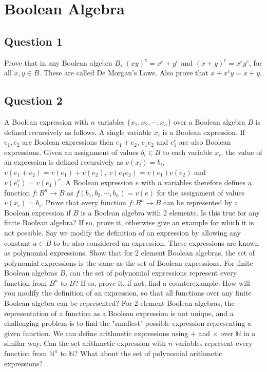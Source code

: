 \documentclass[12pt]{report}
\begin{document}
\chapter{Boolean Algebra}
\section*{Question 1}
Prove that in any Boolean algebra $B$, $(x y)^{c} = x^{c} + y^{c}$ and $(x + y)^{c} = x^{c} y^{c}$, for all $x, y \in B$. These are called De Morgan's Laws. Also prove that $x + x^{c} y = x + y$.
\section*{Question 2}
A Boolean expression with $n$ variables $\{x_{1}, x_{2}, \cdots, x_{n}\}$ over a Boolean algebra $B$ is defined recursively as follows. A single variable $x_{i}$ is a Boolean expression. If $e_{1}, e_{2}$ are Boolean expressions then $e_{1} + e_{2}$, $e_{1} e_{2}$ and $e_{1}^{c}$ are also Boolean expressions. Given an assignment of values $b_{i} \in B$ to each variable $x_{i}$, the value of an expression is defined recursively as $v(x_{i}) = b_{i}$, $v(e_{1} + e_{2}) = v(e_{1}) + v(e_{2})$, $v(e_{1}e_{2}) = v(e_{1})v(e_{2})$ and $v(e_{1}^{c}) = v(e_{1})^{c}$. A Boolean expression $e$ with $n$ variables therefore defines a function $f : B^{n} \rightarrow B$ as $f(b_{1}, b_{2}, \cdots, b_{n}) = v(e)$ for the assignment of values $v(x_{i}) = b_{i}$. Prove that every function $f : B^{n} \rightarrow B$ can be represented by a Boolean expression if $B$ is a Boolean algebra with 2 elements. Is this true for any finite Boolean algebra? If so, prove it, otherwise give an example for which it is not possible. Say we modify the definition of an expression by allowing any constant $a \in B$ to be also considered an expression. These expressions are known as polynomial expressions. Show that for 2 element Boolean algebras, the set of polynomial expressions is the same as the set of Boolean expressions.  For finite Boolean algebras $B$, can the set of polynomial expressions represent every function from $B^{n}$ to $B$? If so, prove it, if not, find a counterexample. How will you modify the definition of an expression, so that all functions over any finite Boolean algebra can be represented? For 2 element Boolean algebras, the representation of a function as a Boolean expression is not unique, and a challenging problem is to find the "smallest" possible expression representing a given function. We can define arithmetic expressions using $+$ and $\times$ over $\mathbb{N}$ in a similar way. Can the set arithmetic expression with $n$-variables represent every function from $\mathbb{N}^{n}$ to $\mathbb{N}$? What about the set of polynomial arithmetic expressions?
\end{document}
